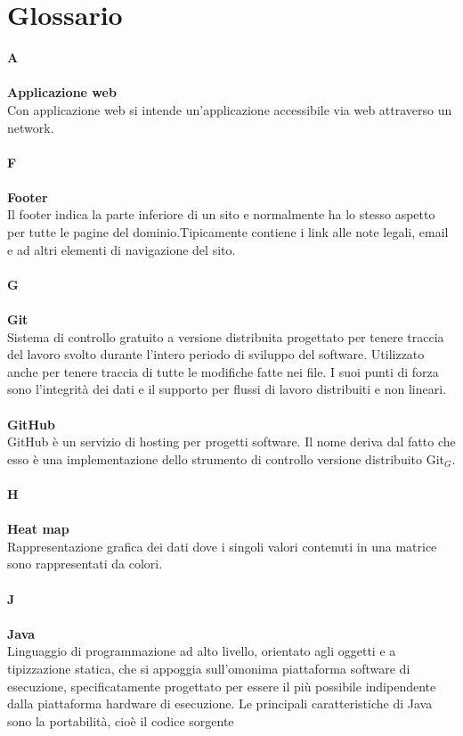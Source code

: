 \chapter{Glossario} \label{Glossario}
\textbf{A} \\
\\
\textbf{Applicazione web} \\
Con applicazione web si intende un'applicazione accessibile via web attraverso un network. \\
\\
\textbf{F} \\
\\
\textbf{Footer} \\
Il footer indica la parte inferiore di un sito e normalmente ha lo stesso aspetto per tutte le pagine del dominio.Tipicamente contiene i link alle note legali, email  e ad altri elementi di navigazione del sito. \\
\\
\textbf{G} \\
\\
\textbf{Git}\\
Sistema di controllo gratuito a versione distribuita progettato per tenere traccia del lavoro svolto durante l'intero periodo di sviluppo del software.
Utilizzato anche per tenere traccia di tutte le modifiche fatte nei file.
I suoi punti di forza sono l'integrità dei dati e il supporto per flussi di lavoro distribuiti e non lineari.\\
\\
\textbf{GitHub} \\
GitHub è un servizio di hosting per progetti software. Il nome deriva dal fatto che esso è una implementazione dello strumento di controllo versione distribuito Git$_G$. \\
\\
\textbf{H} \\
\\
\textbf{Heat map} \\
 Rappresentazione grafica dei dati dove i singoli valori contenuti in una matrice sono rappresentati da colori. \\
\\
\textbf{J} \\
\\
\textbf{Java} \\
Linguaggio di programmazione ad alto livello, orientato agli oggetti e a tipizzazione statica, che si appoggia sull'omonima piattaforma software di esecuzione, specificatamente progettato per essere il più possibile indipendente dalla piattaforma hardware di esecuzione. Le principali caratteristiche di Java sono la portabilità, cioè il codice sorgente
